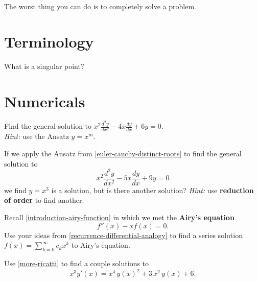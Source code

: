 \documentclass{homework}
\author{Jim Fowler}
\begin{document}
\maketitle

\begin{inspiration}
  The worst thing you can do is to completely solve a problem.
\end{inspiration}

\section{Terminology}

\begin{problem}
  What is a singular point?
\end{problem}

\section{Numericals}

\begin{problem}\label{euler-cauchy-distinct-roots}Find the general solution to \(x^{2}{\displaystyle\frac  {d^{2}y}{dx^{2}}}-4x{\displaystyle\frac  {dy}{dx}}+6y=0\).\\
  \textit{Hint:} use the Ansatz $y = x^m$.
\end{problem}

\begin{problem}\label{euler-cauchy-single-root}If we apply the Ansatz from
  \ref{euler-cauchy-distinct-roots} to find the general solution to
  \[ 
    x^{2}{\frac  {d^{2}y}{dx^{2}}}-5x{\frac  {dy}{dx}}+9y=0
  \]
  we find $y = x^3$ is a solution, but is there another solution?  \textit{Hint:} use  \textbf{reduction of order} to find another.
\end{problem}

\begin{problem}Recall \ref{introduction-airy-function} in which we met the \textbf{Airy's equation}
  \[
    f''(x) - x f(x) = 0.
  \]
  Use your ideas from \ref{recurrence-differential-analogy} to find a series solution $f(x) = \sum_{k=0}^\infty c_k x^k$ to Airy's equation.
\end{problem}

\begin{problem}Use \ref{more-ricatti} to find a couple solutions to
  \[
    x^3 y'(x) = x^4 \, y(x)^2 + 3 \, x^2 \, y(x) + 6.
  \]
\end{problem}
\end{document}
